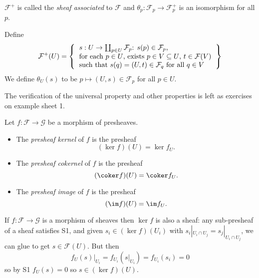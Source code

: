 \documentclass[a4paper]{article}
\newcommand{\sh}[1]{\mathcal{#1}} %
\begin{document}
\(\sh F^+\) is called the \emph{sheaf associated} to \(\sh F\) and \(\theta_p: \sh F_p \to \sh F_p^+\) is an isomorphism for all \(p\).

Define
\[
  \sh F^+(U) =
  \left\{
    \begin{tabular}{l}
      \(s: U \to \coprod_{p \in U} \sh F_p\): \(s(p) \in \sh F_p\), \\
      for each \(p\in U\), exists \(p \in V \subseteq U\), \(t \in \sh F(V)\) \\
      such that \(s(q) = (U, t) \in \sh F_q\) for all \(q \in V\)
    \end{tabular}
  \right\}
\]
We define \(\theta_U(s)\) to be \(p \mapsto (U, s) \in \sh F_p\) for all \(p \in U\).

The verification of the universal property and other properties is left as exercises on example sheet 1.

\begin{definition}
  Let \(f: \sh F \to \sh G\) be a morphism of presheaves.
  \begin{itemize}
  \item The \emph{presheaf kernel} of \(f\) is the presheaf
    \[
      (\ker f)(U) = \ker f_U.
    \]
  \item The \emph{presheaf cokernel} of \(f\) is the presheaf
    \[
      (\coker f)(U) = \coker f_U.
    \]
  \item The \emph{presheaf image} of \(f\) is the presheaf
    \[
      (\im f)(U) = \im f_U.
    \]
  \end{itemize}
\end{definition}

\begin{remark}
  If \(f: \sh F \to \sh G\) is a morphism of sheaves then \(\ker f\) is also a sheaf: any sub-presheaf of a sheaf satisfies S1, and given \(s_i \in (\ker f)(U_i)\) with \(s_i|_{U_i \cap U_j} = s_j|_{U_i \cap U_j}\), we can glue to get \(s \in \sh F(U)\). But then
  \[
    f_U(s)|_{U_i} = f_{U_i}(s|_{U_i}) = f_{U_i}(s_i) = 0
  \]
  so by S1 \(f_U(s) = 0\) so \(s \in (\ker f)(U)\).
\end{remark}
\end{document}
